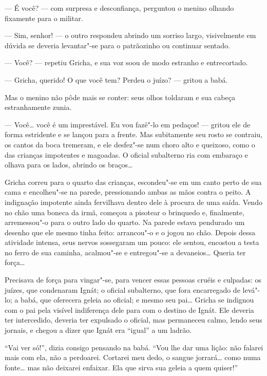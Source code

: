 --- É você? --- com surpresa e desconfiança, perguntou o menino olhando
fixamente para o militar.

--- Sim, senhor! --- o outro respondeu abrindo um sorriso largo,
visivelmente em dúvida se deveria levantar"-se para o patrãozinho ou
continuar sentado.

--- Você? --- repetiu Gricha, e sua voz soou de modo estranho e
entrecortado.

--- Gricha, querido! O que você tem? Perdeu o juízo? --- gritou a babá.

Mas o menino não pôde mais se conter: seus olhos toldaram e sua cabeça
estranhamente zunia.

--- Você\ldots{} você é um imprestável. Eu vou fazê"-lo em pedaços! --- gritou
ele de forma estridente e se lançou para a frente. Mas subitamente seu
rosto se contraiu, os cantos da boca tremeram, e ele desfez"-se num choro
alto e queixoso, como o das crianças impotentes e magoadas. O oficial
subalterno ria com embaraço e olhava para os lados, abrindo os braços\ldots{}

Gricha correu para o quarto das crianças, escondeu"-se em um canto perto
de sua cama e encolheu"-se na parede, pressionando ambas as mãos contra o
peito. A indignação impotente ainda fervilhava dentro dele à procura de
uma saída. Vendo no chão uma boneca da irmã, começou a pisotear o
brinquedo e, finalmente, arremessou"-o para o outro lado do quarto. Na
parede estava pendurado um desenho que ele mesmo tinha feito: arrancou"-o
e o jogou no chão. Depois dessa atividade intensa, seus nervos
sossegaram um pouco: ele sentou, encostou a testa no ferro de sua
caminha, acalmou"-se e entregou"-se a devaneios\ldots{} Queria ter força\ldots{}

Precisava de força para vingar"-se, para vencer essas pessoas cruéis e
culpadas: os juízes, que condenaram Ignát; o oficial subalterno, que
fora encarregado de levá"-lo; a babá, que oferecera geleia ao oficial; e
mesmo seu pai\ldots{} Gricha se indignou com o pai pela visível indiferença
dele para com o destino de Ignát. Ele deveria ter intercedido, deveria
ter expulsado o oficial, mas permaneceu calmo, lendo seus jornais, e
chegou a dizer que Ignát era ``igual'' a um ladrão.

``Vai ver só!'', dizia consigo pensando na babá. ``Vou lhe dar uma
lição: não falarei mais com ela, não a perdoarei. Cortarei meu dedo, o
sangue jorrará\ldots{} como numa fonte\ldots{} mas não deixarei enfaixar. Ela que
sirva sua geleia a quem quiser!''

